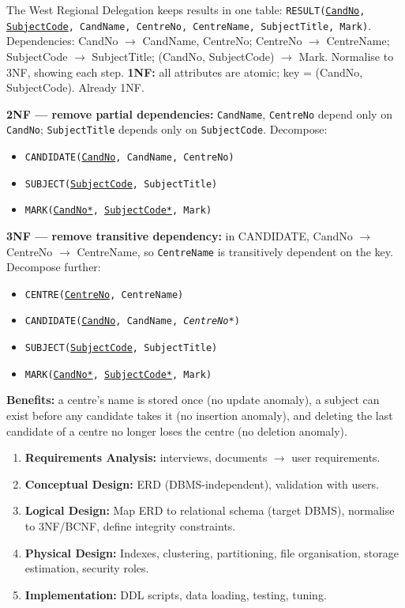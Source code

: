 \documentclass[11pt]{article}
\begin{document}
\begin{exoresolu}
The West Regional Delegation keeps results in one table:
\texttt{RESULT(\underline{CandNo}, \underline{SubjectCode}, CandName, CentreNo, CentreName, SubjectTitle, Mark)}.
Dependencies: CandNo $\to$ CandName, CentreNo; CentreNo $\to$ CentreName; SubjectCode $\to$ SubjectTitle; (CandNo, SubjectCode) $\to$ Mark.
Normalise to 3NF, showing each step.
\tcblower
\textbf{1NF:} all attributes are atomic; key = (CandNo, SubjectCode). Already 1NF.

\textbf{2NF — remove partial dependencies:} \texttt{CandName}, \texttt{CentreNo} depend only on \texttt{CandNo}; \texttt{SubjectTitle} depends only on \texttt{SubjectCode}. Decompose:
\begin{itemize}
\item \texttt{CANDIDATE(\underline{CandNo}, CandName, CentreNo)}
\item \texttt{SUBJECT(\underline{SubjectCode}, SubjectTitle)}
\item \texttt{MARK(\underline{CandNo*}, \underline{SubjectCode*}, Mark)}
\end{itemize}
\textbf{3NF — remove transitive dependency:} in CANDIDATE, CandNo $\to$ CentreNo $\to$ CentreName, so \texttt{CentreName} is transitively dependent on the key. Decompose further:
\begin{itemize}
\item \texttt{CENTRE(\underline{CentreNo}, CentreName)}
\item \texttt{CANDIDATE(\underline{CandNo}, CandName, \emph{CentreNo*})}
\item \texttt{SUBJECT(\underline{SubjectCode}, SubjectTitle)}
\item \texttt{MARK(\underline{CandNo*}, \underline{SubjectCode*}, Mark)}
\end{itemize}
\textbf{Benefits:} a centre's name is stored once (no update anomaly), a subject can exist before any candidate takes it (no insertion anomaly), and deleting the last candidate of a centre no longer loses the centre (no deletion anomaly).
\end{exoresolu}

\begin{aretenir}
\begin{enumerate}
\item \textbf{Requirements Analysis:} interviews, documents $\to$ user requirements.
\item \textbf{Conceptual Design:} ERD (DBMS-independent), validation with users.
\item \textbf{Logical Design:} Map ERD to relational schema (target DBMS), normalise to 3NF/BCNF, define integrity constraints.
\item \textbf{Physical Design:} Indexes, clustering, partitioning, file organisation, storage estimation, security roles.
\item \textbf{Implementation:} DDL scripts, data loading, testing, tuning.
\end{enumerate}
\end{aretenir}
\end{document}
